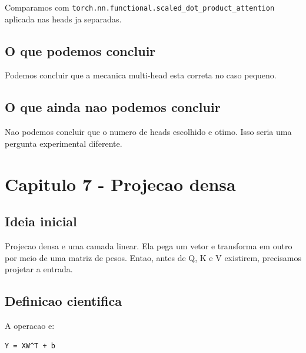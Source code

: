 Comparamos com \texttt{torch.\allowbreak{}nn.\allowbreak{}functional.\allowbreak{}scaled\_\allowbreak{}dot\_\allowbreak{}product\_\allowbreak{}attention} aplicada nas heads ja separadas.



\subsection{O que podemos concluir}



Podemos concluir que a mecanica multi-head esta correta no caso pequeno.



\subsection{O que ainda nao podemos concluir}




Nao podemos concluir que o numero de heads escolhido e otimo. Isso seria uma pergunta experimental diferente.



\section{Capitulo 7 - Projecao densa}



\subsection{Ideia inicial}





Projecao densa e uma camada linear. Ela pega um vetor e transforma em outro por meio de uma matriz de pesos. Entao, antes de Q, K e V existirem, precisamos projetar a entrada.



\subsection{Definicao cientifica}



A operacao e:



\begin{Verbatim}[fontsize=\small,breaklines=true,label=text]
Y = XW^T + b
\end{Verbatim}




